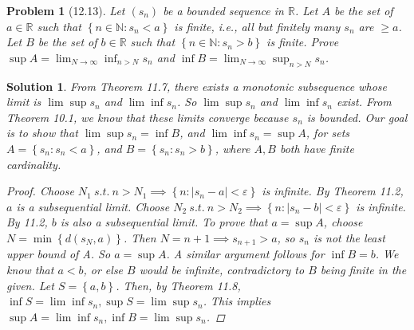 \documentclass[12pt]{article}
\newtheorem{problem}{Problem}
\newtheorem{solution}{Solution}
\begin{document}
\begin{problem}[12.13]
   Let $(s_{n} )$ be a bounded sequence in $\mathbb{R}$. Let $A$ be the set of $a\in\mathbb{R} $ such that $\left\{n \in \mathbb{N} :s_{n} <a \right\} $ is finite, i.e., all but finitely many $s_{n} $ are $\geq a$. Let $B$ be the set of $b\in\mathbb{R} $ such that $\left\{ n\in \mathbb{N}: s_{n} >b \right\} $ is finite. Prove $\sup A=\lim_{N \to \infty} \inf_{n>N}s_{n} $ and $\inf B=\lim_{N \to \infty} \sup_{n>N}s_{n} $.   
\end{problem}

\begin{solution}
   From Theorem 11.7, there exists a monotonic subsequence whose limit is $\lim \sup s_{n} $  and $\lim \inf s_{n} $. So $\lim \sup s_{n} $ and $\lim \inf s_{n} $ exist. From Theorem 10.1, we know that these limits converge because $s_{n} $ is bounded. Our goal is to show that $\lim \sup s_{n}=\inf B $, and $\lim \inf s_{n} =\sup A$, for sets $A=\left\{ s_{n} :s_{n} <a \right\} $, and $B = \left\{ s_{n} :s_{n} >b \right\} $, where $A,B$ both have finite cardinality.    
\begin{proof}
    Choose $N_{1}\ s.t. \ n>N_{1}\implies \left\{  n:\left\vert s_{n} -a \right\vert < \varepsilon \right\}    $ is infinite. By Theorem 11.2, $a$ is a subsequential limit. Choose $N_{2} \ s.t. \ n>N_{2}\implies \left\{ n:\left\vert s_{n} -b \right\vert <\varepsilon   \right\}  $ is infinite. By 11.2, $b$ is also a subsequential limit. To prove that $a=\sup A$, choose $N=\mathop{\min} \left\{ d(s_{N}, a) \right\} $. Then $N=n+1\implies s_{n+1} >a$, so $s_{n} $  is not the least upper bound of A. So $a=\sup A$. A similar argument follows for $\inf B=b$. We know that $a<b$, or else $B$ would be infinite, contradictory to $B$ being finite in the given. Let $S=\left\{ a,b \right\} $. Then, by Theorem 11.8, $\inf S=\lim \inf s_{n}, \sup S=\lim \sup s_{n}  $. This implies $\sup A=\lim \inf s_{n}, \inf B=\lim \sup s_{n}  $.   
\end{proof}
\end{solution}
\end{document}
